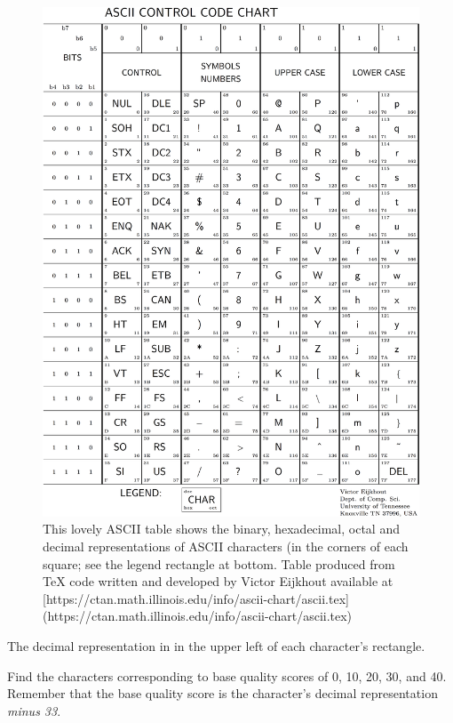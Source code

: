 \documentclass[]{krantz}
\begin{document}
\begin{figure}

{\centering \includegraphics{figs/ascii-crop} 

}

\caption{This lovely ASCII table shows the binary, hexadecimal, octal and decimal representations of ASCII characters (in the corners of each square; see the legend rectangle at bottom.  Table produced from TeX code written and developed by Victor Eijkhout available at [https://ctan.math.illinois.edu/info/ascii-chart/ascii.tex](https://ctan.math.illinois.edu/info/ascii-chart/ascii.tex)}\label{fig:ascii}
\end{figure}

The decimal representation in in the upper left of each character's rectangle.

Find the characters corresponding to base quality scores of 0, 10, 20, 30, and 40. Remember that the
base quality score is the character's decimal representation \emph{minus 33}.
\end{document}
